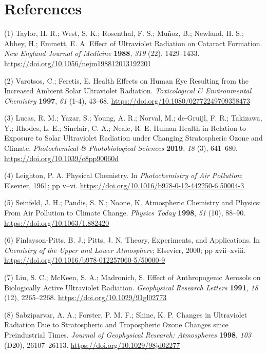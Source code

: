 \documentclass[10pt]{article}
\begin{document}
\FloatBarrier
\section*{References}\sloppy
{}
\label{csl:1}(1) Taylor, H. R.; West, S. K.; Rosenthal, F. S.; Mu{\~{n}}oz, B.; Newland, H. S.; Abbey, H.; Emmett, E. A. {Effect of Ultraviolet Radiation on Cataract Formation}. \textit{New England Journal of Medicine} \textbf{1988}, \textit{319} (22), 1429–1433. \url{https://doi.org/10.1056/nejm198812013192201}

\label{csl:2}(2) Varotsos, C.; Feretis, E. {Health Effects on Human Eye Resulting from the Increased Ambient Solar Ultraviolet Radiation}. \textit{Toxicological {\&} Environmental Chemistry} \textbf{1997}, \textit{61} (1-4), 43–68. \url{https://doi.org/10.1080/02772249709358473}

\label{csl:3}(3) Lucas, R. M.; Yazar, S.; Young, A. R.; Norval, M.; de-Gruijl, F. R.; Takizawa, Y.; Rhodes, L. E.; Sinclair, C. A.; Neale, R. E. {Human Health in Relation to Exposure to Solar Ultraviolet Radiation under Changing Stratospheric Ozone and Climate}. \textit{Photochemical {\&} Photobiological Sciences} \textbf{2019}, \textit{18} (3), 641–680. \url{https://doi.org/10.1039/c8pp90060d}

\label{csl:4}(4) Leighton, P. A. {Physical Chemistry}. In \textit{Photochemistry of Air Pollution}; Elsevier, 1961; pp v--vi. \url{https://doi.org/10.1016/b978-0-12-442250-6.50004-3}

\label{csl:5}(5) Seinfeld, J. H.; Pandis, S. N.; Noone, K. {Atmospheric Chemistry and Physics: From Air Pollution to Climate Change}. \textit{Physics Today} \textbf{1998}, \textit{51} (10), 88–90. \url{https://doi.org/10.1063/1.882420}

\label{csl:6}(6) Finlayson-Pitts, B. J.; Pitts, J. N. {Theory, Experiments, and Applications}. In \textit{Chemistry of the Upper and Lower Atmosphere}; Elsevier, 2000; pp xvii--xviii. \url{https://doi.org/10.1016/b978-012257060-5/50000-9}

\label{csl:7}(7) Liu, S. C.; McKeen, S. A.; Madronich, S. {Effect of Anthropogenic Aerosols on Biologically Active Ultraviolet Radiation}. \textit{Geophysical Research Letters} \textbf{1991}, \textit{18} (12), 2265–2268. \url{https://doi.org/10.1029/91gl02773}

\label{csl:8}(8) Sabziparvar, A. A.; Forster, P. M. F.; Shine, K. P. {Changes in Ultraviolet Radiation Due to Stratospheric and Tropospheric Ozone Changes since Preindustrial Times}. \textit{Journal of Geophysical Research: Atmospheres} \textbf{1998}, \textit{103} (D20), 26107–26113. \url{https://doi.org/10.1029/98jd02277}
\end{document}
